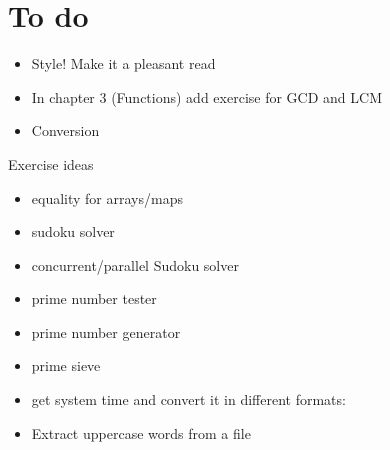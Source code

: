 \section{To do}

\begin{itemize}
Run gotest -test.bench=Bench -test.cpuprofile=cpuprof

    \$(GC) y.go
    \$(LD) -o units y.\$O

This will generate a cpu profile. You can examine it with gopprof:

gopprof 8.out cpuprof

http://blog.golang.org/2011/06/profiling-go-programs.html

- Evan

\item
Style! Make it a pleasant read
\item
In chapter 3 (Functions) add exercise for GCD and LCM
\item
Conversion 
\end{itemize}
Exercise ideas
\begin{itemize}
\item
equality for arrays/maps
\item
sudoku solver
\item
concurrent/parallel Sudoku solver
\item
prime number tester
\item
prime number generator
\item
prime sieve
\item
get system time and convert it in different formats:
\item
Extract uppercase words from a file
\end{itemize}
